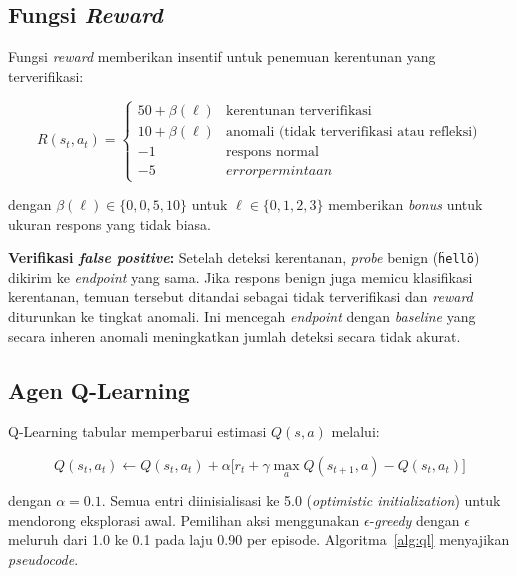 \documentclass[a4paper,12pt]{article}
\begin{document}
\subsection{Fungsi \textit{Reward}}

Fungsi \textit{reward} memberikan insentif untuk penemuan kerentunan yang terverifikasi:

\begin{equation}\label{eq:reward}
R(s_t, a_t) =
\begin{cases}
50 + \beta(\ell) & \text{kerentunan terverifikasi} \\
10 + \beta(\ell) & \text{anomali (tidak terverifikasi atau refleksi)} \\
-1 & \text{respons normal} \\
-5 & \textit{error} permintaan
\end{cases}
\end{equation}

dengan $\beta(\ell) \in \{0,0,5,10\}$ untuk $\ell \in \{0,1,2,3\}$ memberikan \textit{bonus} untuk ukuran respons yang tidak biasa.

\textbf{Verifikasi \textit{false positive}:} Setelah deteksi kerentanan, \textit{probe} benign (\texttt{\"hello\"}) dikirim ke \textit{endpoint} yang sama. Jika respons benign juga memicu klasifikasi kerentanan, temuan tersebut ditandai sebagai tidak terverifikasi dan \textit{reward} diturunkan ke tingkat anomali. Ini mencegah \textit{endpoint} dengan \textit{baseline} yang secara inheren anomali meningkatkan jumlah deteksi secara tidak akurat.

\subsection{Agen Q-Learning}

Q-Learning tabular memperbarui estimasi $Q(s,a)$ melalui:

\begin{equation}\label{eq:qlearning}
Q(s_t,a_t) \leftarrow Q(s_t,a_t) + \alpha\bigl[r_t + \gamma \max_a Q(s_{t+1},a) - Q(s_t,a_t)\bigr]
\end{equation}

dengan $\alpha = 0.1$. Semua entri diinisialisasi ke 5.0 (\textit{optimistic initialization}) untuk mendorong eksplorasi awal. Pemilihan aksi menggunakan $\epsilon$-\textit{greedy} dengan $\epsilon$ meluruh dari 1.0 ke 0.1 pada laju 0.90 per episode. Algoritma~\ref{alg:ql} menyajikan \textit{pseudocode}.
\end{document}
